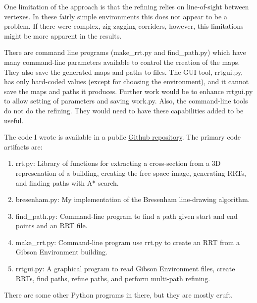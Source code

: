 \documentclass[10pt,twocolumn,letterpaper]{article}
\begin{document}
One limitation of the approach is that the refining relies on
line-of-sight between vertexes. In these fairly simple environments
this does not appear to be a problem. If there were complex,
zig-zagging corriders, however, this limitations might be more
apparent in the results.

There are command line programs (make\_rrt.py and find\_path.py) which
have many command-line parameters available to control the creation of
the maps. They also save the generated maps and paths to files. The
GUI tool, rrtgui.py, has only hard-coded values (except for choosing
the environment), and it cannot save the maps and paths it
produces. Further work would be to enhance rrtgui.py to allow setting
of parameters and saving work.py. Also, the command-line tools do not
do the refining. They would need to have these capabilities added to
be useful.

The code I wrote is available in a public
\href{https://github.com/tenther/cs685-project}{Github repository}. The primary code artifacts are:

\begin{enumerate}
\item rrt.py: Library of functions for extracting a cross-section from
  a 3D represenation of a building, creating the free-space image,
  generating RRTs, and finding paths with A* search.
\item bresenham.py: My implementation of the Bresenham line-drawing algorithm.
\item find\_path.py: Command-line program to find a path given start and end points and
  an RRT file. 
\item make\_rrt.py: Command-line program use rrt.py to create an RRT
  from a Gibson Environment building.
\item rrtgui.py: A graphical program to read Gibson Environment files,
  create RRTs, find paths, refine paths, and perform multi-path refining.
\end{enumerate}

There are some other Python programs in there, but they are mostly cruft.



\end{document}

